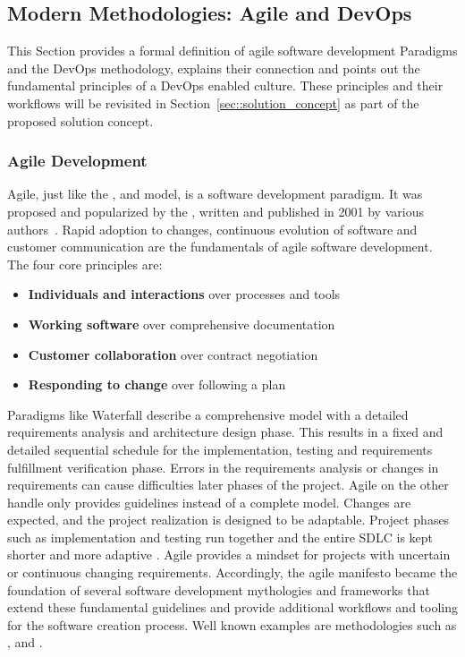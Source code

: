 \documentclass[12pt, a4paper]{article}
\begin{document}
    \subsection{Modern Methodologies: Agile and DevOps}\label{ssec::devops}
    This Section provides a formal definition of agile software development Paradigms and the DevOps methodology, explains their connection and points out the fundamental principles of a DevOps enabled culture. These principles and their workflows will be revisited in Section~\ref{sec::solution_concept} as part of the proposed solution concept.

        \subsubsection{Agile Development}
        Agile, just like the ,  and  model, is a software development paradigm. It was proposed and popularized by the , written and published in 2001 by various authors~\cite{manifesto}. Rapid adoption to changes, continuous evolution of software and customer communication are the fundamentals of agile software development.\newline
        The four core principles are:

        \begin{itemize}[label=\(\star\)]
            \setlength\itemsep{0em}
            \item \textbf{Individuals and interactions} over processes and tools
            \item \textbf{Working software} over comprehensive documentation
            \item \textbf{Customer collaboration} over contract negotiation
            \item \textbf{Responding to change} over following a plan
        \end{itemize}

        \noindent Paradigms like Waterfall describe a comprehensive model with a detailed requirements analysis and architecture design phase. This results in a fixed and detailed sequential schedule for the implementation, testing and requirements fulfillment verification phase. Errors in the requirements analysis or changes in requirements can cause difficulties later phases of the project. Agile on the other handle only provides guidelines instead of a complete model. Changes are expected, and the project realization is designed to be adaptable. Project phases such as implementation and testing run together and the entire \ac{SDLC} is kept shorter and more adaptive \cite{agile_practice}.\newline
        Agile provides a mindset for projects with uncertain or continuous changing requirements. Accordingly, the agile manifesto became the foundation of several software development mythologies and frameworks that extend these fundamental guidelines and provide additional workflows and tooling for the software creation process. Well known examples are methodologies such as ,  and .
\end{document}
